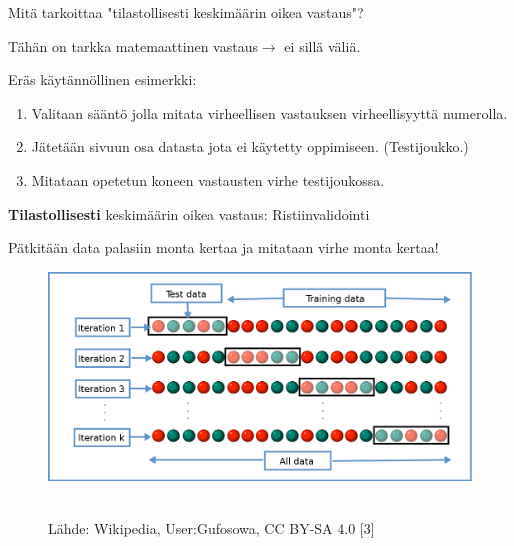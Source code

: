\documentclass[presentation]{beamer}
\begin{document}
\begin{frame}{Mitä tarkoittaa "tilastollisesti keskimäärin oikea vastaus"?}

Tähän on tarkka matemaattinen vastaus$\to$ ei sillä väliä.

\pause
\begin{block}{Eräs käytännöllinen esimerkki:}

\begin{enumerate}
    \item<2-> Valitaan sääntö jolla mitata virheellisen vastauksen virheellisyyttä numerolla.
    \item<3-> Jätetään sivuun osa datasta jota ei käytetty oppimiseen. (Testijoukko.)
    \item<4-> Mitataan opetetun koneen vastausten virhe testijoukossa.
\end{enumerate}

\end{block}


\end{frame}

\begin{frame}{\textbf{Tilastollisesti} keskimäärin oikea vastaus: Ristiinvalidointi}

Pätkitään data palasiin monta kertaa ja mitataan virhe monta kertaa!

	\begin{figure}
				\includegraphics[width=\textwidth]{kfold_wikipedia.png} \
				\caption*{ Lähde: Wikipedia, User:Gufosowa, CC BY-SA 4.0 [3]}
	\end{figure}

    
\end{frame}
\end{document}
